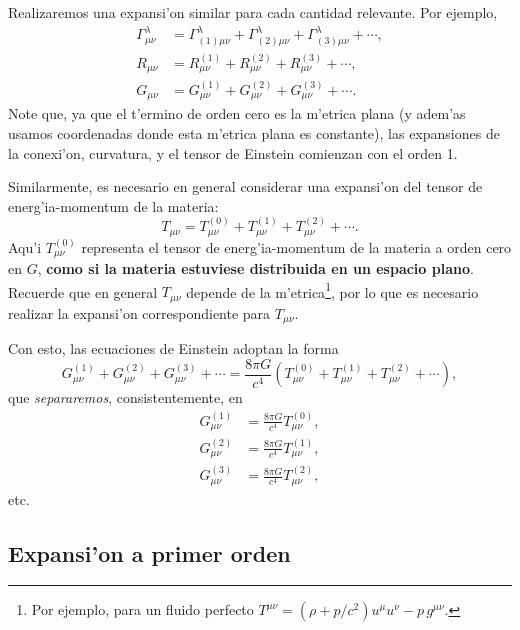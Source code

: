 
Realizaremos una expansi'on similar para cada cantidad relevante. Por ejemplo,
\begin{align}
\Gamma^\lambda_{\mu\nu} &= \Gamma^{\lambda}_{(1)\mu\nu}+\Gamma^{\lambda}_{(2)\mu\nu}+\Gamma^{\lambda}_{(3)\mu\nu}+\cdots, \\
R_{\mu\nu} &= R^{(1)}_{\mu\nu}+R^{(2)}_{\mu\nu}+R^{(3)}_{\mu\nu}+\cdots,\\
G_{\mu\nu} &= G^{(1)}_{\mu\nu}+G^{(2)}_{\mu\nu}+G^{(3)}_{\mu\nu}+\cdots.
\end{align}
Note que, ya que el t'ermino de orden cero es la m'etrica plana (y adem'as usamos coordenadas donde esta m'etrica plana es constante), las expansiones de la conexi'on, curvatura, y el tensor de Einstein comienzan con el orden 1.

Similarmente, es necesario en general considerar una expansi'on del tensor de energ'ia-momentum de la materia:
\begin{equation}
T_{\mu\nu}=T^{(0)}_{\mu\nu}+T^{(1)}_{\mu\nu}+T^{(2)}_{\mu\nu}+\cdots.
\end{equation}
Aqu'i $T_{\mu\nu}^{(0)}$ representa el tensor de energ'ia-momentum de la materia a orden cero en $G$, \textbf{como si la materia estuviese distribuida en un espacio plano}. Recuerde que en general $T_{\mu\nu}$ depende de la m'etrica\footnote{Por ejemplo, para un fluido perfecto $T^{\mu\nu}=(\rho+p/c^2) u^\mu u^\nu-p\,g^{\mu\nu}$.}, por lo que es necesario realizar la expansi'on correspondiente para $T_{\mu\nu}$.

Con esto, las ecuaciones de Einstein adoptan la forma
\begin{equation}
G^{(1)}_{\mu\nu}+G^{(2)}_{\mu\nu}+G^{(3)}_{\mu\nu}+\cdots=
\frac{8\pi G}{c^4}\left(T^{(0)}_{\mu\nu}+T^{(1)}_{\mu\nu}+T^{(2)}_{\mu\nu}+\cdots\right),
\end{equation}
que \textit{separaremos}, consistentemente, en
\begin{align}
G^{(1)}_{\mu\nu}&=\frac{8\pi G}{c^4}T^{(0)}_{\mu\nu},\label{orden1}\\
G^{(2)}_{\mu\nu}&=\frac{8\pi G}{c^4}T^{(1)}_{\mu\nu},\\
G^{(3)}_{\mu\nu}&=\frac{8\pi G}{c^4}T^{(2)}_{\mu\nu}\label{orden3},
\end{align}
etc.

\subsection{Expansi'on a primer orden}

